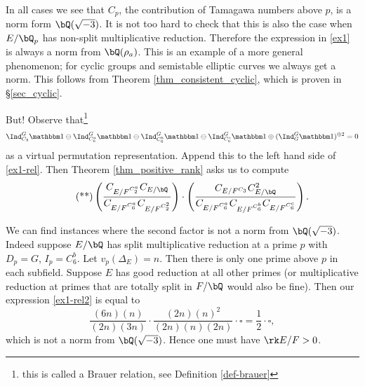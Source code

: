 \begin{example}
    In all cases we see that $C_p$, the contribution of Tamagawa numbers above $p$, is a norm form $\bQ(\sqrt{-3})$. It is not too hard to check that this is also the case when $E / \bQ_p$ has non-split multiplicative reduction. Therefore the expression in \eqref{ex1} is always a norm from $\bQ(\rho_a)$. This is an example of a more general phenomenon; for cyclic groups and semistable elliptic curves we always get a norm. This follows from  Theorem \ref{thm_consistent_cyclic}, which is proven in \S\ref{sec_cyclic}.

    But! Observe that{\footnote{this is called a Brauer relation, see Definition \ref{def-brauer}}} 
    \[ \Ind_{C_3}^G \trivial \ominus \Ind_{C_6^a}^G \trivial \ominus \Ind_{C_6^b}^G \trivial \ominus \Ind_{C_6^c}^G \trivial \oplus (\Ind_G^G \trivial)^{\oplus 2} = 0 \]
    as a virtual permutation representation. Append this to the left hand side of \eqref{ex1-rel}. Then Theorem \ref{thm_positive_rank} asks us to compute 
    \begin{equation}\label{ex1-rel2}\tag{**}
    \left(\frac{C_{E / F^{C_2^a}} C_{E / \bQ} }{C_{E / F^{C_6^a}} C_{E / F^{C_2^2}}}\right) \cdot \left( \frac{C_{E / F^{C_3}} C_{E / \bQ}^2}{C_{E / F^{C_6^a}}C_{E / F^{C_6^b}}  C_{E / F^{C_6^c}} } \right). 
    \end{equation}
    
    We can find instances where the second factor is not a norm from $\bQ(\sqrt{-3})$. Indeed suppose $E / \bQ$ has split multiplicative reduction at a prime $p$ with $D_p = G$, $I_p = C_6^b$. Let $v_p(\Delta_E) = n$. Then there is only one prime above $p$ in each subfield. Suppose $E$ has good reduction at all other primes (or multiplicative reduction at primes that are totally split in $F / \bQ$ would also be fine).
     Then our expression \eqref{ex1-rel2} is equal to
     \[ \frac{(6n)(n)}{(2n) (3n)} \cdot \frac{(2n)(n)^2}{(2n)(n)(2n)} \cdot \square = \frac{1}{2} \cdot \square, \] 
     which is not a norm from $\bQ(\sqrt{-3})$. Hence one must have $\rk E / F > 0$. 
\end{example}

